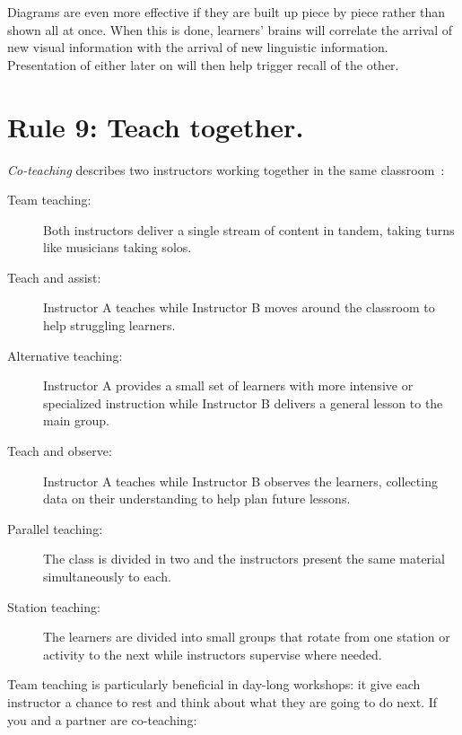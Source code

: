 \documentclass[10pt,letterpaper]{article}
\newcommand{\rulemajor}[1]{\section{#1}}
\begin{document}
Diagrams are even more effective if they are built up piece by piece rather than shown all at once.
When this is done,
learners' brains will correlate the arrival of new visual information
with the arrival of new linguistic information.
Presentation of either later on will then help trigger recall of the other.

\rulemajor{Rule 9: Teach together.}

\emph{Co-teaching} describes two instructors working together in the same classroom~\cite{Frie2016}:

\begin{description}

\item[Team teaching:]
  Both instructors deliver a single stream of content in tandem,
  taking turns like musicians taking solos.

\item[Teach and assist:]
  Instructor A teaches while Instructor B moves around the classroom
  to help struggling learners.

\item[Alternative teaching:]
  Instructor A provides a small set of learners with more intensive or specialized instruction
  while Instructor B delivers a general lesson to the main group.

\item[Teach and observe:]
  Instructor A teaches while Instructor B observes the learners,
  collecting data on their understanding to help plan future lessons.

\item[Parallel teaching:]
  The class is divided in two
  and the instructors present the same material simultaneously to each.

\item[Station teaching:]
  The learners are divided into small groups
  that rotate from one station or activity to the next
  while instructors supervise where needed.

\end{description}

Team teaching is particularly beneficial in day-long workshops:
it give each instructor a chance to rest and think about what they are going to do next.
If you and a partner are co-teaching:
\end{document}
